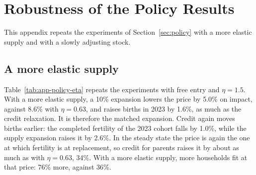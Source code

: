 \providecommand{\pend}{\textcolor{red}{[pending]}}
\providecommand{\PRF}{../../output/model/experiments/housing_supply/20261021_paper_results}

\section{Robustness of the Policy Results}
\label{app:policy-robust}

This appendix repeats the experiments of Section~\ref{sec:policy} with a more
elastic supply and with a slowly adjusting stock.

\subsection{A more elastic supply}
\label{app:policy-eta}

Table~\ref{tab:app-policy-eta} repeats the experiments with free entry and
$\eta=1.5$. With a more elastic supply, a 10\% expansion lowers the price by
5.0\% on impact, against 8.6\% with $\eta=0.63$, and raises births in 2023 by
1.6\%, as much as the credit relaxation. It is therefore the matched
expansion. Credit again
moves births earlier: the completed fertility of the 2023 cohort falls by
1.0\%, while the supply expansion raises it by 2.6\%. In the steady state the price
is again the one at which fertility is at replacement, so credit for parents
raises it by about as much as with $\eta=0.63$, 34\%. With a more elastic
supply, more households fit at that price: 76\% more, against 36\%.

